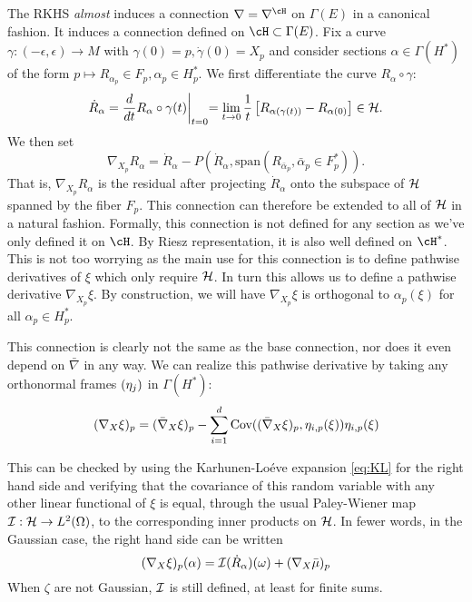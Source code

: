 \documentclass{article}
\newcommand{\randsec}{\xi}
\newcommand{\meansec}{\bar{\mu}}
\begin{document}
The RKHS {\em almost} induces a connection $\nabla=\nabla^{\cH}$ on $\Gamma(E)$  in a canonical fashion.
It induces a connection defined on $\cH \subset \Gamma(E)$.
Fix a curve $\gamma:(-\epsilon,\epsilon) \to M$ with $\gamma(0)=p, \dot{\gamma}(0)=X_p$
and consider sections $\alpha \in \Gamma(H^*)$ of the form
$p \mapsto R_{\alpha_p} \in F_p, \alpha_p \in H^*_p$.
We first differentiate the curve $R_{\alpha} \circ \gamma$:
\begin{equation}
\dot{R}_{\alpha} = \frac{d}{dt} R_{\alpha} \circ \gamma(t) \biggl|_{t=0} = \lim_{t \to 0} \frac{1}{t} \left[ R_{\alpha(\gamma(t))} - R_{\alpha(0)}\right] \in {\cal H}.
\end{equation}
We then set
$$
\nabla_{X_p}R_{\alpha} = \dot{R}_{\alpha} - P(\dot{R}_{\alpha}, \text{span}(R_{\bar{\alpha}_p}, \bar{\alpha}_p \in F_p^*)).
$$
That is, $\nabla_{X_p}R_{\alpha}$ is the residual after projecting $\dot{R}_{\alpha}$ onto the subspace of ${\cal H}$ spanned by the fiber $F_p$.
This connection can therefore be extended to all of ${\cal H}$ in a natural fashion.
Formally, this connection is not defined for any section as we've only defined it on $\cH$. By Riesz
representation,
it is also well defined on $\cH^*$. This is not too worrying as the main use for this connection is to define pathwise derivatives of $\randsec$ which only require
${\cal H}$. In turn this allows us to define
a pathwise derivative $\nabla_{X_p}\randsec$. By construction, we will have $\nabla_{X_p}\randsec$ is orthogonal
to $\alpha_p(\randsec)$ for all $\alpha_p \in H_p^*$.

This connection is clearly not the same as the base connection, nor
does it even depend on $\bar{\nabla}$ in any way. We can realize this pathwise derivative by
taking any orthonormal frames $(\eta_{j})$ in $\Gamma(H^*)$:
\begin{equation}
\label{eq:pathwise:1}
(\nabla_X\randsec)_p = (\bar{\nabla}_X\randsec)_p - \sum_{i=1}^d \text{Cov}((\bar{\nabla}_X\randsec)_p, \ONF_{i,p}(\randsec))
 \ONF_{i,p}(\randsec)
\end{equation}

This can be checked by using the Karhunen-Lo\'eve expansion
\eqref{eq:KL} for the right hand side and verifying that the
covariance of this random variable with any other linear functional of
$\randsec$ is equal, through the usual Paley-Wiener map ${\cal I}:{\cal H}
\to L^2(\Omega)$, to the corresponding inner products on ${\cal
  H}$. In fewer words, in the Gaussian case, the right hand side can be written
\begin{equation}
  \label{eq:pathwise:2}
(\nabla_X\randsec)_p(\alpha) = {\cal I}(\dot{R}_{\alpha})(\omega) + (\nabla_X \meansec)_p
\end{equation}
When $\zeta$ are not Gaussian, ${\cal I}$ is still defined, at least for finite sums.
\end{document}
